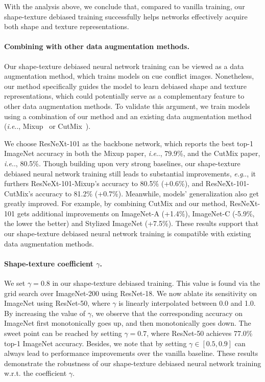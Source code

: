 \documentclass{article} \usepackage{iclr2021_conference,times}
\makeatletter
\DeclareRobustCommand\onedot{\futurelet\@let@token\@onedot}
\def\@onedot{\ifx\@let@token.\else.\null\fi\xspace}
\def\eg{\emph{e.g}\onedot} \def\Eg{\emph{E.g}\onedot}
\def\ie{\emph{i.e}\onedot} \def\Ie{\emph{I.e}\onedot}
\makeatother
\begin{document}
With the analysis above, we conclude that, compared to vanilla training, our shape-texture debiased training successfully helps networks effectively acquire both shape and texture representations.



\paragraph{Combining with other data augmentation methods.}
Our shape-texture debiased neural network training can be viewed as a data augmentation method, which trains models on cue conflict images. Nonetheless, our method specifically guides the model to learn debiased shape and texture representations, which could potentially serve as a complementary feature to other data augmentation methods. To validate this argument, we train models using a combination of our method and an existing data augmentation method (\ie, Mixup~\citep{zhang2018mixup} or CutMix~\citep{yun2019cutmix}). 


We choose ResNeXt-101 \citep{xie2017aggregated} as the backbone network, which reports the best top-1 ImageNet accuracy in both the Mixup paper, \ie, 79.9\%, and the CutMix paper, \ie, 80.5\%. 
Though building upon very strong baselines, our shape-texture debiased neural network training still leads to substantial improvements, \eg, it furthers ResNeXt-101-Mixup's accuracy to 80.5\% (+0.6\%), and ResNeXt-101-CutMix's accuracy to 81.2\% (+0.7\%). Meanwhile, models' generalization also get greatly improved. For example, by combining CutMix and our method, ResNeXt-101 gets additional improvements on ImageNet-A (+1.4\%), ImageNet-C (-5.9\%, the lower the better) and Stylized ImageNet (+7.5\%).
These results support that our shape-texture debiased neural network training
is compatible with existing data augmentation methods.





\paragraph{Shape-texture coefficient $\gamma$.}
We set $\gamma=0.8$ in our shape-texture debiased training. This value is found via the grid search over ImageNet-200 using ResNet-18. We now ablate its sensitivity on ImageNet using ResNet-50, where $\gamma$ is linearly interpolated between 0.0 and 1.0. By increasing the value of $\gamma$, we observe that the corresponding accuracy on ImageNet first monotonically goes up, and then monotonically goes down. The sweet point can be reached by setting $\gamma=0.7$, where ResNet-50 achieves 77.0\% top-1 ImageNet accuracy. Besides, we note that by setting $\gamma \in [0.5, 0.9]$ can always lead to performance improvements over the vanilla baseline. These results demonstrate the robustness of our shape-texture debiased neural network training w.r.t. the coefficient $\gamma$.
\end{document}
